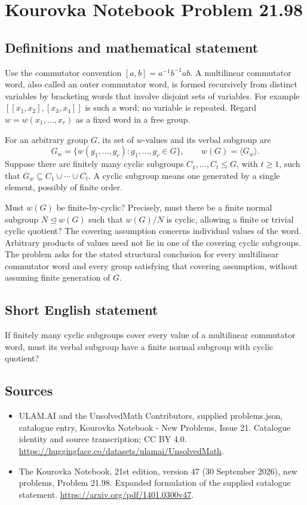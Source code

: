 \documentclass[11pt,a4paper]{article}
\begin{document}
\section*{Kourovka Notebook Problem 21.98}\label{statement}

\subsection{Definitions and mathematical statement}
Use the commutator convention $[a,b]=a^{-1}b^{-1}ab$. A multilinear commutator word, also called an outer commutator word, is formed recursively from distinct variables by bracketing words that involve disjoint sets of variables. For example $[[x_1,x_2],[x_3,x_4]]$ is such a word; no variable is repeated. Regard $w=w(x_1,\ldots,x_r)$ as a fixed word in a free group.

For an arbitrary group $G$, its set of $w$-values and its verbal subgroup are
\[
 G_w=\{w(g_1,\ldots,g_r):g_1,\ldots,g_r\in G\},
 \qquad w(G)=\langle G_w\rangle.
\]
Suppose there are finitely many cyclic subgroups $C_1,\ldots,C_t\le G$, with $t\ge1$, such that $G_w\subseteq C_1\cup\cdots\cup C_t$. A cyclic subgroup means one generated by a single element, possibly of finite order.

Must $w(G)$ be finite-by-cyclic? Precisely, must there be a finite normal subgroup $N\trianglelefteq w(G)$ such that $w(G)/N$ is cyclic, allowing a finite or trivial cyclic quotient? The covering assumption concerns individual values of the word. Arbitrary products of values need not lie in one of the covering cyclic subgroups. The problem asks for the stated structural conclusion for every multilinear commutator word and every group satisfying that covering assumption, without assuming finite generation of $G$.
\subsection{Short English statement}
If finitely many cyclic subgroups cover every value of a multilinear commutator word, must its verbal subgroup have a finite normal subgroup with cyclic quotient?
\subsection{Sources}
\begin{itemize}
\item[S1] ULAM.AI and the UnsolvedMath Contributors, supplied problems.json, catalogue entry, Kourovka Notebook - New Problems, Issue 21. Catalogue identity and source transcription; CC BY 4.0.
\url{https://huggingface.co/datasets/ulamai/UnsolvedMath}.
\item[S2] The Kourovka Notebook, 21st edition, version 47 (30 September 2026), new problems, Problem 21.98. Expanded formulation of the supplied catalogue statement.
\url{https://arxiv.org/pdf/1401.0300v47}.
\end{itemize}
\end{document}
